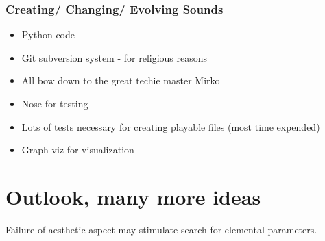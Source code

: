 \documentclass{beamer}
\begin{document}
\begin{frame}
	\frametitle{Creating/ Changing/ Evolving Sounds}
	\begin{itemize}
	\item<1-> Python code 
	\item<2-> Git subversion system - for religious reasons
	\item<3-> All bow down to the great techie master Mirko
	\item<4-> Nose for testing 
	\item<5-> Lots of tests necessary for creating playable files (most time expended)
	\item<6-> Graph viz for visualization
         \end{itemize}

\end{frame}


\label{sg:sec:imple}




\section{Outlook, many more ideas} %
\label{sg:sec:outlook_many_more_ideas}

 Failure of aesthetic aspect may stimulate search for elemental parameters.




\end{document}
